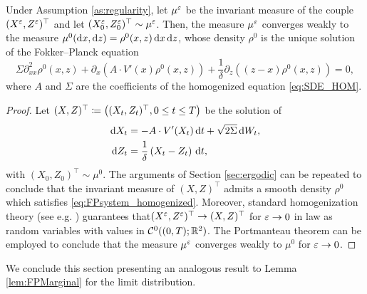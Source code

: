 \documentclass[10pt]{article}
\begin{document}
\begin{lemma}\label{lem:convMeasure} Under Assumption \ref{as:regularity}, let $\mu^\varepsilon$ be the invariant measure of the couple $(X^\varepsilon, Z^\varepsilon)^\top$ and let $(X_0^\varepsilon, Z_0^\varepsilon)^\top \sim \mu^\varepsilon$. Then, the measure $\mu^\varepsilon$ converges weakly to the measure $\mu^0(\mathrm{d} x, \mathrm{d} z) = \rho^0(x, z) \,\mathrm{d} x \,\mathrm{d} z$, whose density $\rho^0$ is the unique solution of the Fokker--Planck equation
\begin{equation} \label{eq:FPsystem_homogenized}
	\Sigma \partial^2_{xx} \rho^0(x,z) + \partial_x\left( A \cdot V'(x) \rho^0(x,z) \right) + \frac{1}{\delta}\partial_z\left((z - x) \rho^0(x,z) \right) = 0,
\end{equation}
where $A$ and $\Sigma$ are the coefficients of the homogenized equation \eqref{eq:SDE_HOM}.
\end{lemma}
\begin{proof} Let $(X, Z)^\top \coloneqq \left((X_t, Z_t)^\top, 0\leq t \leq T\right)$ be the solution of
	\begin{equation}
	\label{eq:systemSDEHom}
	\begin{aligned}
		\mathrm{d} X_t &= -A \cdot V'(X_t) \,\mathrm{d} t + \sqrt{2\Sigma} \,\mathrm{d} W_t, \\
		\mathrm{d} Z_t &= \frac{1}{\delta} \left ( X_t - Z_t \right ) \,\mathrm{d} t,
	\end{aligned}
	\end{equation} 
	with $(X_0, Z_0)^\top \sim \mu^0$. The arguments of Section \ref{sec:ergodic} can be repeated to conclude that the invariant measure of $(X, Z)^\top$ admits a smooth density $\rho^0$ which satisfies \eqref{eq:FPsystem_homogenized}. Moreover, standard homogenization theory (see e.g. \cite[Chapter 3]{BLP78}) guarantees that$(X^\varepsilon,Z^\varepsilon)^\top \to (X,Z)^\top$ for $\varepsilon \to 0$ in law as random variables with values in $\mathcal C^0((0, T); \mathbb{R}^2)$. The Portmanteau theorem can be employed to conclude that the measure $\mu^\varepsilon$ converges weakly to $\mu^0$ for $\varepsilon \to 0$.
\end{proof}

We conclude this section presenting an analogous result to Lemma \ref{lem:FPMarginal} for the limit distribution.
\end{document}
